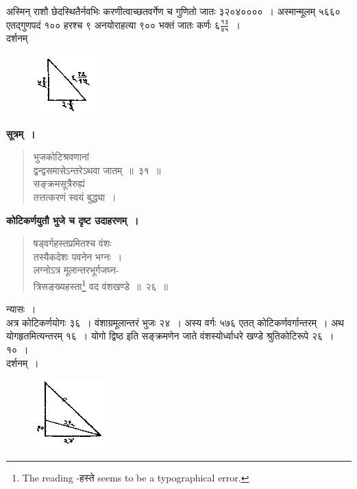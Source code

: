 \documentclass[11pt, openany]{book}
\begin{document}
\noindent अस्मिन् राशौ छेदस्थितैर्नवभिः करणीत्वाच्छतवर्गेण च गुणितो
जातः ३२०४००००~। अस्मान्मूलम् ५६६० एतद्गुणपदं १०० हरश्च ९ अनयोराहत्या
९०० भक्तं जातः कर्णः $\mbox{६}\frac{\mbox{१३}}{\mbox{४५}}$~। \\

\vspace{-4mm}
दर्शनम्
\begin{figure}[h!]
    \centering
    \includegraphics[scale=0.85]{graphics/capture33.png}
\end{figure}
\newpage

 \textbf{सूत्रम्~।} 
\begin{quote}
    \bs
    भुजकोटिश्रवणानां \\
    द्वन्द्वसमासेऽन्तरेऽथवा जातम्~॥~३१~॥\\
सङ्क्रमसूत्रैरुह्यं \\
तत्तत्करणं स्वयं बुद्ध्या~। 
\end{quote}

 \textbf{कोटिकर्णयुतौ भुजे च दृष्ट उदाहरणम्~।} 
\begin{quote}
    \bqt 
    षड्वर्गहस्तप्रमितश्च वंशः \\
    तस्यैकदेशः पवनेन भग्नः~।\\
लग्नोऽत्र मूलान्तरभूर्गजघ्न-\\
त्रिसङ्ख्यहस्ता\footnote{The reading -हस्ते seems to be a typographical error.} वद वंशखण्डे~॥~२६~॥
\end{quote}
 
 न्यासः~। \\

\vspace{-4mm}
 अत्र कोटिकर्णयोगः ३६~। वंशाग्रमूलान्तरं भुजः २४~। अस्य
वर्गः ५७६ एतत् कोटिकर्णवर्गान्तरम्~। अथ योगहृतमित्यन्तरम्
१६~। योगो द्विष्ठ इति सङ्क्रमणेन जाते वंशस्योर्ध्वाधरे खण्डे
श्रुतिकोटिरूपे २६~। १०~। \\

\vspace{-4mm}
दर्शनम्~। 

\begin{figure}[h!]
    \centering
    \includegraphics[scale=0.8]{graphics/capture34.png}
\end{figure}
\newpage
 
\end{document}
